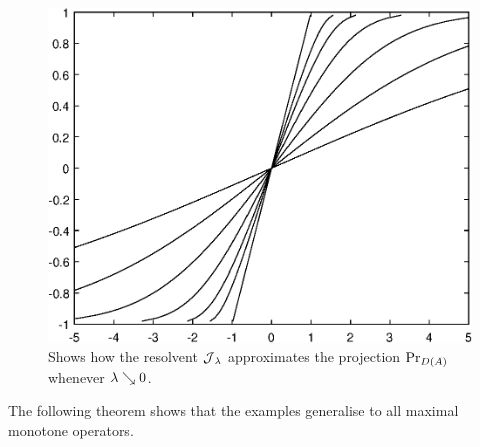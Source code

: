 \begin{figure}
	\centering
	\includegraphics{projectionExample}
	\caption{Shows how the resolvent $ \operatorname{\mathcal{J}}_\lambda $
		approximates the projection $ \operatorname{\mathrm{Pr}}_{D(A)} $ whenever
		$ \lambda\searrow 0 $.}
	\label{fig:example of projection}
\end{figure}

The following theorem shows that the examples generalise to all maximal monotone
operators.

